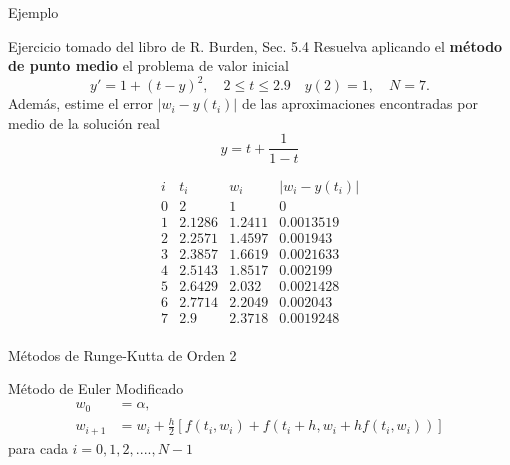 \begin{frame}{Ejemplo}
\begin{block}{Ejercicio tomado del libro de R. Burden, Sec. 5.4}
Resuelva aplicando el \textbf{método de punto medio} el problema de valor inicial
$$y'=1+(t-y)^2, \quad 2\leq t\leq 2.9 \quad y(2)=1, \quad N=7.$$
Además, estime el error $|w_i-y(t_i)|$ de las aproximaciones encontradas por medio de la solución real 
$$y=t+\dfrac{1}{1-t}$$
\end{block}
\begin{displaymath}
\begin{array}{r|lll}
i& t_i& w_i & |w_i-y(t_i)|\\
\hline\hline
0&2&1   &0\\
1&2.1286&1.2411 &0.0013519\\
2&2.2571&1.4597 &0.001943\\
3&2.3857&1.6619 &0.0021633\\
4&2.5143&1.8517 &0.002199\\
5&2.6429&2.032  &0.0021428\\
6&2.7714&2.2049 &0.002043\\
7&2.9&2.3718    &0.0019248\\
\end{array}
\end{displaymath}
\end{frame}

\begin{frame}{Métodos de Runge-Kutta de Orden 2}
\begin{block}{Método de Euler Modificado}
\begin{align*}
w_0 &=\alpha,\\
w_{i+1}&=w_{i}+\frac{h}{2}[f(t_i, w_i)+f(t_i+h, w_i+hf(t_i, w_i))]
\end{align*}
\hspace{3cm}para cada $i=0, 1, 2,...., N-1$
\end{block}
\end{frame}

